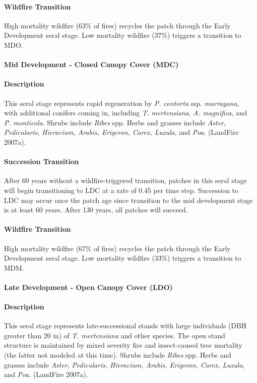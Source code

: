 \paragraph*{Wildfire Transition} High mortality wildfire (63\% of fires) recycles the patch through the Early Development seral stage. Low mortality wildfire (37\%) triggers a transition to MDO.

\noindent\hrulefill

\paragraph*{Mid Development - Closed Canopy Cover (MDC)}

\paragraph*{Description} This seral stage represents rapid regeneration by \emph{P. contorta} ssp. \emph{murrayana}, with additional conifers coming in, including \emph{T. mertensiana}, \emph{A. magnifica}, and \emph{P. monticola}. Shrubs include \emph{Ribes} spp. Herbs and grasses include \emph{Aster, Pedicularis, Hieracium, Arabis, Erigeron, Carex, Luzula}, and \emph{Poa}. (LandFire 2007a).

\paragraph*{Succession Transition} After 60 years without a wildfire-triggered transition, patches in this seral stage will begin transitioning to LDC at a rate of 0.45 per time step. Succession to LDC may occur once the patch age since transition to the mid development stage is at least 60 years. After 130 years, all patches will succeed.

\paragraph*{Wildfire Transition} High mortality wildfire (67\% of fires) recycles the patch through the Early Development seral stage. Low mortality wildfire (33\%) triggers a transition to MDM.

\noindent\hrulefill


\paragraph*{Late Development - Open Canopy Cover (LDO)}

\paragraph*{Description} This seral stage represents late-successional stands with large individuals (DBH greater than 20 in) of \emph{T. mertensiana} and other species. The open stand structure is maintained by mixed severity fire and insect-caused tree mortality (the latter not modeled at this time). Shrubs include \emph{Ribes} spp. Herbs and grasses include \emph{Aster, Pedicularis, Hieracium, Arabis, Erigeron, Carex, Luzula}, and \emph{Poa}. (LandFire 2007a).

